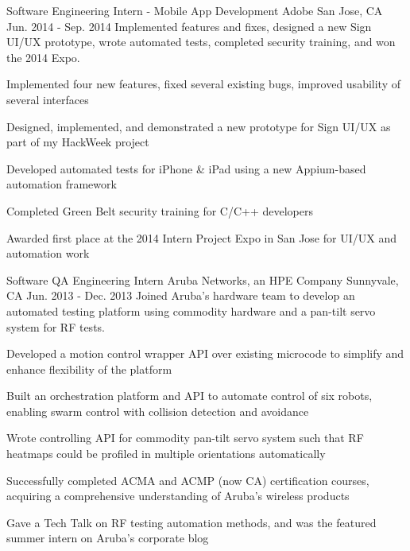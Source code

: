 \begin{cventries}
\cventry
    {Software Engineering Intern - Mobile App Development} %
    {Adobe} %
    {San Jose, CA} %
    {Jun. 2014 - Sep. 2014} %
    {Implemented features and fixes, designed a new Sign UI/UX prototype, wrote automated tests, completed security training, and won the 2014 Expo.} %
    {
      \begin{cvitems} %
        \item {Implemented four new features, fixed several existing bugs, improved usability of several interfaces}
        \item {Designed, implemented, and demonstrated a new prototype for Sign UI/UX as part of my HackWeek project}
        \item {Developed automated tests for iPhone \& iPad using a new Appium-based automation framework}
        \item {Completed Green Belt security training for C/C++ developers}
        \item {Awarded first place at the 2014 Intern Project Expo in San Jose for UI/UX and automation work}
      \end{cvitems}
    }

\cventry
    {Software QA Engineering Intern} %
    {Aruba Networks, an HPE Company} %
    {Sunnyvale, CA} %
    {Jun. 2013 - Dec. 2013} %
    {Joined Aruba's hardware team to develop an automated testing platform using commodity hardware and a pan-tilt servo system for RF tests.} %
    {
      \begin{cvitems} %
        \item {Developed a motion control wrapper API over existing microcode to simplify and enhance flexibility of the platform}
        \item {Built an orchestration platform and API to automate control of six robots, enabling swarm control with collision detection and avoidance}
        \item {Wrote controlling API for commodity pan-tilt servo system such that RF heatmaps could be profiled in multiple orientations automatically}
        \item {Successfully completed ACMA and ACMP (now CA) certification courses, acquiring a comprehensive understanding of Aruba's wireless products}
        \item {Gave a Tech Talk on RF testing automation methods, and was the featured summer intern on Aruba's corporate blog}
      \end{cvitems}
    }


\end{cventries}
